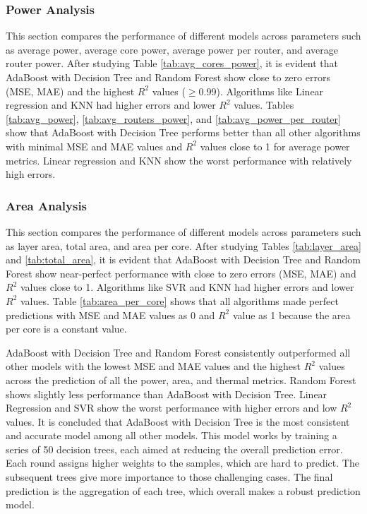 \documentclass[conference]{IEEEtran}
\begin{document}
	\subsubsection{Power Analysis}
	This section compares the performance of different models across parameters such as average power, average core power, average power per router, and average router power. After studying Table \ref{tab:avg_cores_power}, it is evident that AdaBoost with Decision Tree and Random Forest show close to zero errors (MSE, MAE) and the highest $R^2$ values ($\geq$0.99). Algorithms like Linear regression and KNN had higher errors and lower $R^2$ values. Tables \ref{tab:avg_power}, \ref{tab:avg_routers_power}, and \ref{tab:avg_power_per_router} show that AdaBoost with Decision Tree performs better than all other algorithms with minimal MSE and MAE values and $R^2$ values close to 1 for average power metrics. Linear regression and KNN show the worst performance with relatively high errors.
	
	\subsubsection{Area Analysis}
	This section compares the performance of different models across parameters such as layer area, total area, and area per core. After studying Tables \ref{tab:layer_area} and \ref{tab:total_area}, it is evident that AdaBoost with Decision Tree and Random Forest show near-perfect performance with close to zero errors (MSE, MAE) and $R^2$ values close to 1. Algorithms like SVR and KNN had higher errors and lower $R^2$ values. Table \ref{tab:area_per_core} shows that all algorithms made perfect predictions with MSE and MAE values as 0 and $R^2$ value as 1 because the area per core is a constant value.
	
	AdaBoost with Decision Tree and Random Forest consistently outperformed all other models with the lowest MSE and MAE values and the highest $R^2$ values across the prediction of all the power, area, and thermal metrics. Random Forest shows slightly less performance than AdaBoost with Decision Tree. Linear Regression and SVR show the worst performance with higher errors and low $R^2$ values. It is concluded that AdaBoost with Decision Tree is the most consistent and accurate model among all other models. This model works by training a series of 50 decision trees, each aimed at reducing the overall prediction error. Each round assigns higher weights to the samples, which are hard to predict. The subsequent trees give more importance to those challenging cases. The final prediction is the aggregation of each tree, which overall makes a robust prediction model. 
\end{document}
